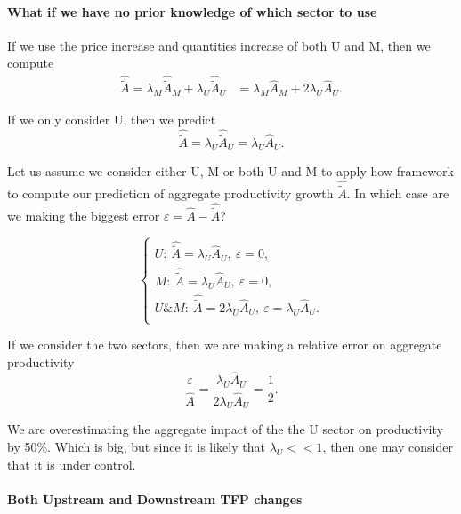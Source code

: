 \documentclass[11pt]{article}
\begin{document}
\paragraph{What if we have no prior knowledge of which sector to use}
If we use the price increase and quantities increase of both U and M, then we compute
\begin{align*}
 \hat{\tilde{A}}=\lambda_M  \hat{\tilde{A}}_M +  \lambda_U  \hat{\tilde{A}}_U 
    &=
    \lambda_M  \hat{A}_M +  2\lambda_U  \hat{A}_U.
\end{align*}

If we only consider U, then we predict
\begin{equation*}
 \hat{\tilde{A}}=  \lambda_U  \hat{\tilde{A}}_U= \lambda_U  \hat{A}_U.
\end{equation*}

Let us assume we consider either U, M or both U and M to apply how framework to compute our prediction of aggregate productivity growth $\hat{\tilde{A}}$. In which case are we making the biggest error $\varepsilon=\hat{A}-\hat{\tilde{A}}$?

\begin{equation}
\begin{cases}
    U:~ \hat{\tilde{A}}=  \lambda_U  \hat{A}_U, ~\varepsilon=0,\\
      M:~ \hat{\tilde{A}}=  \lambda_U \hat{A}_U, ~\varepsilon= 0,\\
        U\&M:~ \hat{\tilde{A}}=   2\lambda_U  \hat{A}_U , ~\varepsilon= \lambda_U  \hat{A}_U.\\
\end{cases}
\end{equation}

If we consider the two sectors, then we are making a relative error on aggregate productivity 
\begin{equation*}
   \frac{\varepsilon}{\hat{A}}= \frac{\lambda_U  \hat{A}_U}{ 2\lambda_U \hat{A}_U}=\frac{1}{2}.
\end{equation*}

We are overestimating the aggregate impact of the the U sector on productivity by 50\%. Which is big, but since it is likely that $\lambda_U<<1$, then one may consider that it is under control.


\vspace{3mm}
\paragraph{Both Upstream and Downstream TFP changes\\}
\end{document}
